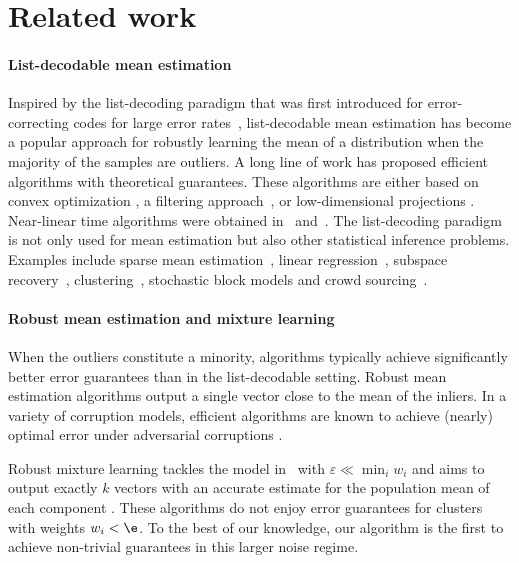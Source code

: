 \section{Related work}
\label{sec:relatedwork}

\paragraph{List-decodable mean estimation} Inspired by the list-decoding paradigm that was first introduced for error-correcting codes for large error rates~\cite{elias1957list}, list-decodable mean estimation has become a popular approach for robustly learning the mean of a distribution when the majority of the samples are outliers. 
A long line of work has proposed efficient algorithms with theoretical guarantees.
These algorithms are either based on convex optimization \cite{charikar2017learning,kothari2018robust}, a filtering approach~\cite{diakonikolas2018list, diakonikolas2020list}, or low-dimensional projections \cite{diakonikolas2021list}.
Near-linear time algorithms were obtained in~\cite{cherapanamjeri2020list} and~\cite{diakonikolas2022clustering}.
The list-decoding paradigm is not only used for mean estimation but also other statistical inference problems.
Examples include sparse mean estimation~\citep{diakonikolas2022list, zeng2022list}, linear regression~\cite{karmalkar2019list, raghavendra2020alist, diakonikolas2021statistical}, subspace recovery~\cite{bakshi2021list, raghavendra2020blist}, clustering~\citep{balcan2008discriminative}, stochastic block models and crowd sourcing~\cite{charikar2017learning, meister2018data}.


\paragraph{Robust mean estimation and mixture learning}
When the outliers constitute a minority,
algorithms typically achieve significantly better error guarantees than in the list-decodable setting.
Robust mean estimation algorithms output a single vector close to the mean of the inliers.
In a variety of corruption models, efficient algorithms are known to achieve (nearly) optimal error under adversarial corruptions \cite{diakonikolas2019robust,lai2016agnostic,charikar2017learning,diakonikolas2017being,hopkins2018mixture,kothari2018robust}.

Robust mixture learning tackles the model in~ with $\varepsilon \ll \min_i w_i$
and aims to output exactly $k$ vectors with an accurate estimate for the population mean of each component \cite{diakonikolas2018list,hopkins2018mixture,kothari2018robust,bakshi2020outlier,liu2021settling,bakshi2022robustly,ivkov2022list}.
These algorithms do not enjoy error guarantees for clusters with weights $w_i < \e$.
To the best of our knowledge, our algorithm is the first to achieve non-trivial guarantees in this larger noise regime.

